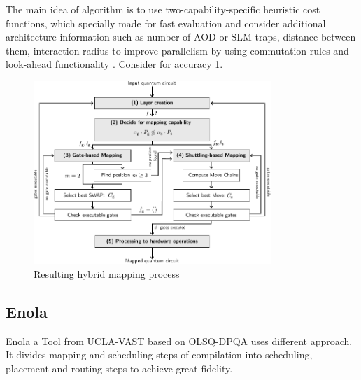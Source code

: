 The main idea of algorithm is to use two-capability-specific heuristic cost functions, 
which specially made for fast evaluation 
and consider additional architecture information 
such as number of \ac{AOD} or \ac{SLM} traps, distance between them, interaction radius 
to improve parallelism by using commutation rules and look-ahead functionality \parencite{schmid2023hybridcircuitmappingleveraging}.
Consider for accuracy \ref{fig:overview_HybridMapper}.

\begin{figure}[htbp]
  \centering
    \includegraphics[width=0.8\textwidth]{figures/overviewHybridMapper.pdf}
    \caption{Resulting hybrid mapping process \parencite{schmid2023hybridcircuitmappingleveraging}}
    \label{fig:overview_HybridMapper}
\end{figure}
\subsection{Enola}
Enola a Tool from \ac{UCLA-VAST} based on OLSQ-DPQA uses different approach.
It divides mapping and scheduling steps of compilation into scheduling, placement and routing steps to achieve great fidelity.

